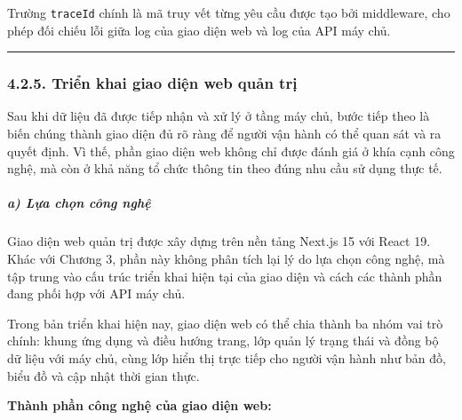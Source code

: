 \documentclass[a4paper]{extarticle}
\begin{document}
Trường \texttt{traceId} chính là mã truy vết từng yêu cầu được tạo bởi
middleware, cho phép đối chiếu lỗi giữa log của giao diện web và log của API máy chủ.

\begin{center}\rule{0.5\linewidth}{0.5pt}\end{center}

\subsubsection{4.2.5. Triển khai giao diện web quản trị}\label{425-triux1ec3n-khai-frontend-dashboard-frontend-dashboard-implementation}

Sau khi dữ liệu đã được tiếp nhận và xử lý ở tầng máy chủ, bước tiếp
theo là biến chúng thành giao diện đủ rõ ràng để người vận hành có thể
quan sát và ra quyết định. Vì thế, phần giao diện web không chỉ được
đánh giá ở khía cạnh công nghệ, mà còn ở khả năng tổ chức thông tin theo
đúng nhu cầu sử dụng thực tế.

\subparagraph{a) Lựa chọn công
nghệ}\label{a-lux1ef1a-chux1ecdn-cuxf4ng-nghux1ec7-2}

Giao diện web quản trị được xây dựng trên nền tảng Next.js 15 với React
19. Khác với Chương 3, phần này không phân tích lại lý do lựa chọn công
nghệ, mà tập trung vào cấu trúc triển khai hiện tại của giao diện và cách
các thành phần đang phối hợp với API máy chủ.

Trong bản triển khai hiện nay, giao diện web có thể chia thành ba nhóm
vai trò chính: khung ứng dụng và điều hướng trang, lớp quản lý trạng thái
và đồng bộ dữ liệu với máy chủ, cùng lớp hiển thị trực tiếp cho người
vận hành như bản đồ, biểu đồ và cập nhật thời gian thực.

\textbf{Thành phần công nghệ của giao diện web:}
\end{document}
